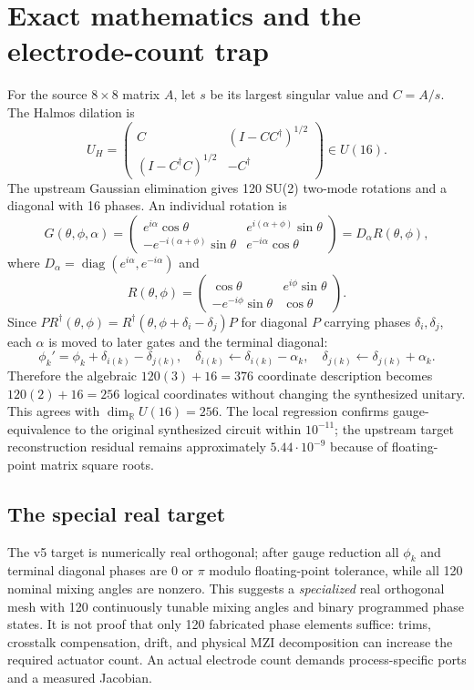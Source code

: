 \documentclass[10pt]{article}
\begin{document}
\section{Exact mathematics and the electrode-count trap}
For the source $8\times8$ matrix $A$, let $s$ be its largest singular value and $C=A/s$. The Halmos dilation is
\[
U_H=\begin{pmatrix}
C&(I-CC^\dagger)^{1/2}\\
(I-C^\dagger C)^{1/2}&-C^\dagger
\end{pmatrix}\in U(16).
\]
The upstream Gaussian elimination gives 120 SU(2) two-mode rotations and a diagonal with 16 phases. An individual rotation is
\[
G(\theta,\phi,\alpha)=
\begin{pmatrix}
e^{i\alpha}\cos\theta&e^{i(\alpha+\phi)}\sin\theta\\
-e^{-i(\alpha+\phi)}\sin\theta&e^{-i\alpha}\cos\theta
\end{pmatrix}
=D_\alpha R(\theta,\phi),
\]
where $D_\alpha=\operatorname{diag}(e^{i\alpha},e^{-i\alpha})$ and
\[
R(\theta,\phi)=\begin{pmatrix}
\cos\theta&e^{i\phi}\sin\theta\\
-e^{-i\phi}\sin\theta&\cos\theta
\end{pmatrix}.
\]
Since $P R^\dagger(\theta,\phi)=R^\dagger(\theta,\phi+\delta_i-\delta_j)P$ for diagonal $P$ carrying phases $\delta_i,\delta_j$, each $\alpha$ is moved to later gates and the terminal diagonal:
\[
\phi_k'=\phi_k+\delta_{i(k)}-\delta_{j(k)},\quad
\delta_{i(k)}\leftarrow\delta_{i(k)}-\alpha_k,\quad
\delta_{j(k)}\leftarrow\delta_{j(k)}+\alpha_k.
\]
Therefore the algebraic $120(3)+16=376$ coordinate description becomes $120(2)+16=256$ logical coordinates without changing the synthesized unitary. This agrees with $\dim_{\mathbb R}U(16)=256$. The local regression confirms gauge-equivalence to the original synthesized circuit within $10^{-11}$; the upstream target reconstruction residual remains approximately $5.44\cdot10^{-9}$ because of floating-point matrix square roots.

\subsection{The special real target}
The v5 target is numerically real orthogonal; after gauge reduction all $\phi_k$ and terminal diagonal phases are $0$ or $\pi$ modulo floating-point tolerance, while all 120 nominal mixing angles are nonzero. This suggests a \emph{specialized} real orthogonal mesh with 120 continuously tunable mixing angles and binary programmed phase states. It is not proof that only 120 fabricated phase elements suffice: trims, crosstalk compensation, drift, and physical MZI decomposition can increase the required actuator count. An actual electrode count demands process-specific ports and a measured Jacobian.
\end{document}
